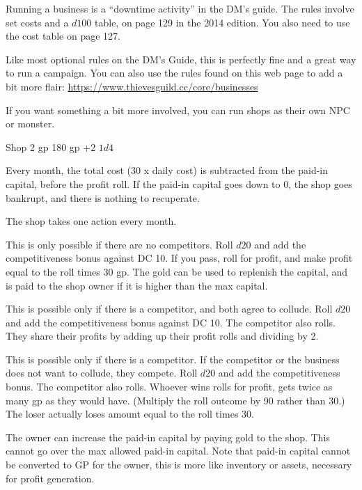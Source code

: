 \documentclass[twocolumn]{dndbook}
\begin{document}
Running a business is a ``downtime activity'' in the DM's guide.
The rules involve set costs and a $d100$ table, on page 129 in the 2014 edition.
You also need to use the cost table on page 127.\par

Like most optional rules on the DM's Guide, this is perfectly fine and a great way to run a campaign.
You can also use the rules found on this web page to add a bit more flair:
\url{https://www.thievesguild.cc/core/businesses}\par

If you want something a bit more involved, you can run shops as their own NPC or monster.\par

\begin{DndMonster}[width=.5\textwidth - 8pt]{Shop}
	\hfill 2 gp
	\hfill 180 gp
	\hfill +2
	\hfill $1d4$

	Every month, the total cost (30 x daily cost) is subtracted
	from the paid-in capital, before the profit roll.
	If the paid-in capital goes down to 0, the shop goes bankrupt,
	and there is nothing to recuperate.

	The shop takes one action every month.

	This is only possible if there are no competitors.
	Roll $d20$ and add the competitiveness bonus against DC 10.
	If you pass, roll for profit, and make profit equal to the roll
	times 30 gp. The gold can be used to replenish the capital,
	and is paid to the shop owner if it is higher than the max capital.

	This is possible only if there is a competitor, and both agree to collude.
	Roll $d20$ and add the competitiveness bonus against DC 10.
	The competitor also rolls. They share their profits by adding up
	their profit rolls and dividing by 2.

	This is possible only if there is a competitor. If the competitor
	or the business does not want to collude, they compete.
	Roll $d20$ and add the competitiveness bonus.
	The competitor also rolls.
	Whoever wins rolls for profit, gets twice as many gp as they would have.
	(Multiply the roll outcome by 90 rather than 30.)
	The loser actually loses amount equal to the roll times 30.


	The owner can increase the paid-in capital by paying gold to the shop.
	This cannot go over the max allowed paid-in capital.
	Note that paid-in capital cannot be converted to GP for the owner,
	this is more like inventory or assets, necessary for profit generation.


\end{DndMonster}
\end{document}
